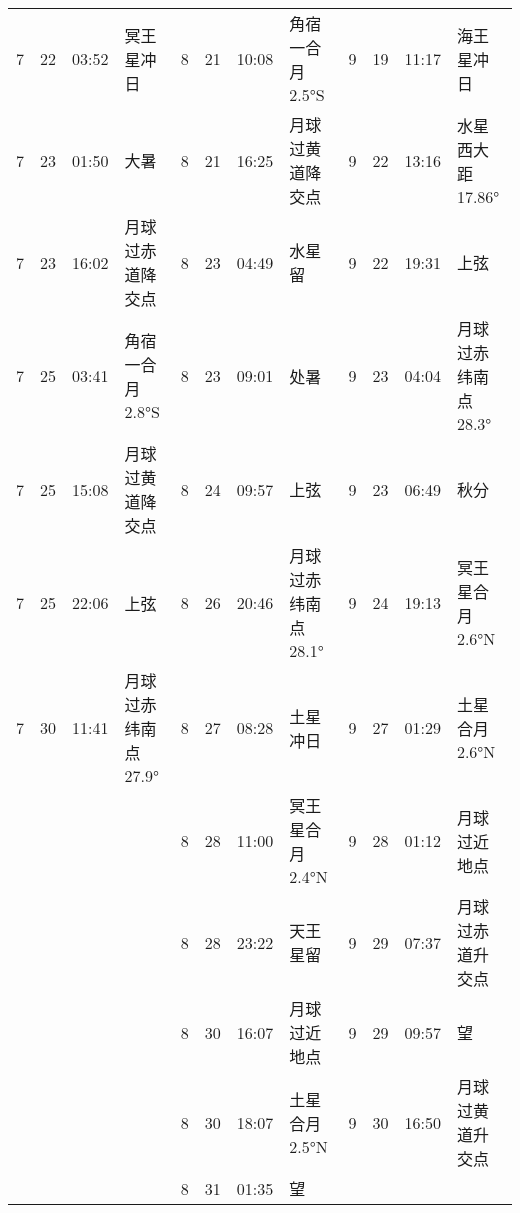 \begin{tabular}{llll|llll|llll}
7 & 22 & 03:52 & 冥王星冲日 & 8 & 21 & 10:08 & 角宿一合月 2.5°S & 9 & 19 & 11:17 & 海王星冲日 \tabularnewline
7 & 23 & 01:50 & 大暑 & 8 & 21 & 16:25 & 月球过黄道降交点 & 9 & 22 & 13:16 & 水星西大距 17.86° \tabularnewline
7 & 23 & 16:02 & 月球过赤道降交点 & 8 & 23 & 04:49 & 水星留 & 9 & 22 & 19:31 & 上弦 \tabularnewline
7 & 25 & 03:41 & 角宿一合月 2.8°S & 8 & 23 & 09:01 & 处暑 & 9 & 23 & 04:04 & 月球过赤纬南点 28.3° \tabularnewline
7 & 25 & 15:08 & 月球过黄道降交点 & 8 & 24 & 09:57 & 上弦 & 9 & 23 & 06:49 & 秋分 \tabularnewline
7 & 25 & 22:06 & 上弦 & 8 & 26 & 20:46 & 月球过赤纬南点 28.1° & 9 & 24 & 19:13 & 冥王星合月 2.6°N \tabularnewline
7 & 30 & 11:41 & 月球过赤纬南点 27.9° & 8 & 27 & 08:28 & 土星冲日 & 9 & 27 & 01:29 & 土星合月 2.6°N \tabularnewline
 &  &  &  & 8 & 28 & 11:00 & 冥王星合月 2.4°N & 9 & 28 & 01:12 & 月球过近地点 \tabularnewline
 &  &  &  & 8 & 28 & 23:22 & 天王星留 & 9 & 29 & 07:37 & 月球过赤道升交点 \tabularnewline
 &  &  &  & 8 & 30 & 16:07 & 月球过近地点 & 9 & 29 & 09:57 & 望 \tabularnewline
 &  &  &  & 8 & 30 & 18:07 & 土星合月 2.5°N & 9 & 30 & 16:50 & 月球过黄道升交点 \tabularnewline
 &  &  &  & 8 & 31 & 01:35 & 望 &  &  &  &  \tabularnewline
\hline \end{tabular}

